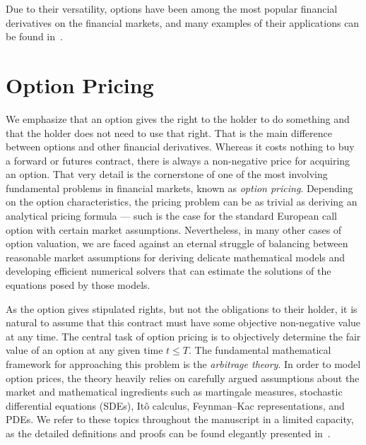 \documentclass{UUThesisTemplate}
\begin{document}
\par
Due to their versatility, options have been among the most popular financial derivatives on the financial markets, and many examples of their applications can be found in~\cite{hull2017options}.
%
%





%
\chapter{Option Pricing}
\label{ch:optionpricing}

\par
We emphasize that an option gives the right to the holder to do something and that the holder does not need to use that right. That is the main difference between options and other financial derivatives. Whereas it costs nothing to buy a forward or futures contract, there is always a non-negative price for acquiring an option. That very detail is the cornerstone of one of the most involving fundamental problems in financial markets, known as \emph{option pricing}. Depending on the option characteristics, the pricing problem can be as trivial as deriving an analytical pricing formula --- such is the case for the standard European call option with certain market assumptions. Nevertheless, in many other cases of option valuation, we are faced against an eternal struggle of balancing between reasonable market assumptions for deriving delicate mathematical models and developing efficient numerical solvers that can estimate the solutions of the equations posed by those models.

\par
As the option gives stipulated rights, but not the obligations to their holder, it is natural to assume that this contract must have some objective non-negative value at any time. The central task of option pricing is to objectively determine the fair value of an option at any given time $t \leq T$. The fundamental mathematical framework for approaching this problem is the \emph{arbitrage theory}. In order to model option prices, the theory heavily relies on carefully argued assumptions about the market and mathematical ingredients such as martingale measures, stochastic differential equations (SDEs), It\^o calculus, Feynman--Kac representations, and PDEs. We refer to these topics throughout the manuscript in a limited capacity, as the detailed definitions and proofs can be found elegantly presented in~\cite{bjork2009arbitrage}.
%
\end{document}
